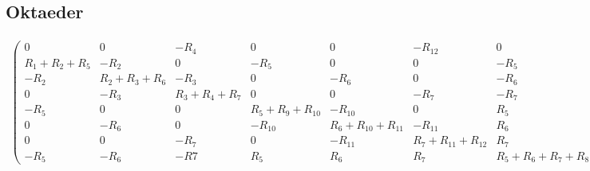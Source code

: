 \documentclass[10pt,a4paper]{article}
\begin{document}
\begin{landscape}
\subsection{Oktaeder}
\begin{align}
\begin{pmatrix}
	0 & 0 & -R_4 & 0 & 0 & -R_{12} & 0 & R_4 + R_{12} \\
	R_1 + R_2 + R_5 & -R_2 & 0 & -R_5 & 0 & 0 &-R_5 & 0 \\
	-R_2 & R_2 + R_3 + R_6 & -R_3 & 0 & -R_6 & 0 & -R_6 & 0 \\
	0 & -R_3 & R_3 + R_4 + R_7 & 0 & 0 & -R_7 & -R_7 & -R_4 \\
	-R_5 & 0 & 0 & R_5 + R_9 + R_{10} & -R_{10} & 0 & R_5 & 0 \\
	0 & -R_6 & 0 & -R_{10} & R_6 + R_{10} + R_{11} & -R_{11} & R_6 & 0 \\
	0 & 0 & -R_7 & 0 & -R_{11} & R_7 + R_{11} + R_{12} & R_7 & -R_{12} \\
	-R_5 & -R_6 & -R7 & R_5 & R_6 & R_7 & R_5 + R_6 + R_7 + R_8 & 0
\end{pmatrix}
\begin{pmatrix}
I_1\\ I_2\\ I_3\\I_4\\I_5\\I_6\\I_7\\I_ges
\end{pmatrix}
=
\begin{pmatrix}
U\\0\\0\\0\\0\\0\\0\\0
\end{pmatrix}
\label{eqn:oktaeder_ganz}
\end{align}

\thispagestyle{empty}
\end{landscape}
\end{document}
